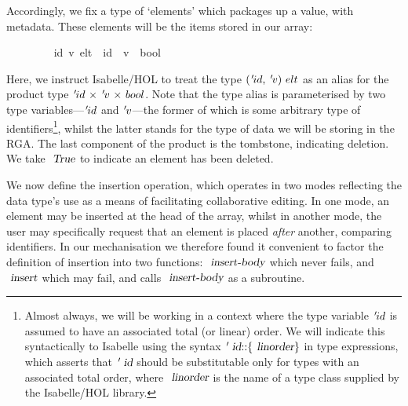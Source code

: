 \documentclass[acmlarge,review,anonymous]{acmart}\settopmatter{printfolios=true}
\begin{document}
Accordingly, we fix a type of `elements' which packages up a value, with metadata.
These elements will be the items stored in our array:
\\
\begin{isabellebody}
\ \ \ \ \ \ \ \  {\isacharparenleft}{\isacharprime}id{\isacharcomma}\ {\isacharprime}v{\isacharparenright}\ elt\ {\isacharequal}\ {\isachardoublequoteopen}{\isacharprime}id\ {\isasymtimes}\ {\isacharprime}v\ {\isasymtimes}\ bool{\isachardoublequoteclose}%
\end{isabellebody}
\vspace{\baselineskip}
Here, we instruct Isabelle/HOL to treat the type ${\isacharparenleft}{\isacharprime}id{\isacharcomma}\ {\isacharprime}v{\isacharparenright}\ elt$ as an alias for the product type ${\isacharprime}id\ {\isasymtimes}\ {\isacharprime}v\ {\isasymtimes}\ bool$.
Note that the type alias is parameterised by two type variables---${\emph{$\mskip2mu{'}\mskip-2mu$}}id$ and ${\emph{$\mskip2mu{'}\mskip-2mu$}}v$---the former of which is some arbitrary type of identifiers\footnote{Almost always, we will be working in a context where the type variable ${\emph{$\mskip2mu{'}\mskip-2mu$}}id$ is assumed to have an associated total (or linear) order.
We will indicate this syntactically to Isabelle using the syntax ${\isacharprime}\isa{id}{\isacharcolon}{\isacharcolon}{\isacharbraceleft}\isa{linorder}{\isacharbraceright}$ in type expressions, which asserts that ${\isacharprime}\isa{id}$ should be substitutable only for types with an associated total order, where $\isa{linorder}$ is the name of a type class supplied by the Isabelle/HOL library.}, whilst the latter stands for the type of data we will be storing in the RGA.
The last component of the product is the tombstone, indicating deletion.
We take $\isa{True}$ to indicate an element has been deleted.

We now define the insertion operation, which operates in two modes reflecting the data type's use as a means of facilitating collaborative editing.
In one mode, an element may be inserted at the head of the array, whilst in another mode, the user may specifically request that an element is placed \emph{after} another, comparing identifiers.
In our mechanisation we therefore found it convenient to factor the definition of insertion into two functions: $\isa{insert-body}$ which never fails, and $\isa{insert}$ which may fail, and calls $\isa{insert-body}$ as a subroutine.
\end{document}
